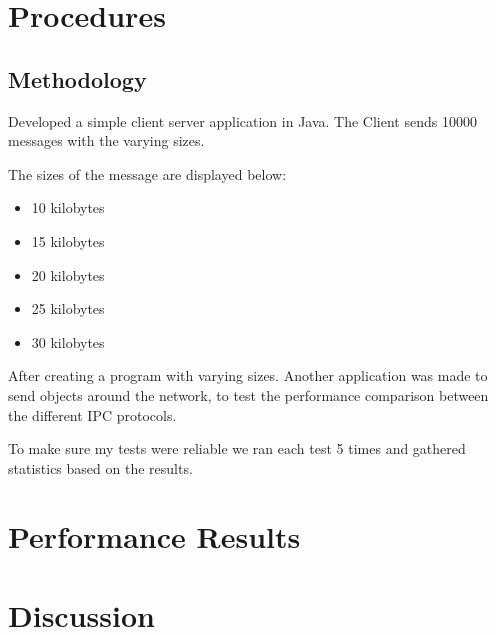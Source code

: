 \documentclass{article}
\begin{document}
\section{Procedures}

\subsection{Methodology}
Developed a simple client server application in Java. The Client sends 10000 messages with the varying sizes. 

The sizes of the message are displayed below: 
\begin{itemize}
\item 10 kilobytes
\item 15 kilobytes
\item 20 kilobytes
\item 25 kilobytes
\item 30 kilobytes
\end{itemize}

After creating a program with varying sizes. Another application was made to send objects around the network, to test the performance 
comparison between the different IPC protocols. 

To make sure my tests were reliable we ran each test 5 times and gathered statistics based on the results.




\section{Performance Results}





\section{Discussion}


\end{document}
